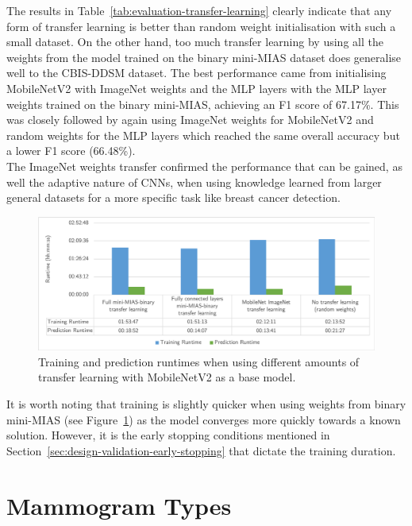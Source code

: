 

The results in Table~\ref{tab:evaluation-transfer-learning} clearly indicate that any form of transfer learning is better than random weight initialisation with such a small dataset. On the other hand, too much transfer learning by using all the weights from the model trained on the binary mini-MIAS dataset does generalise well to the CBIS-DDSM dataset. The best performance came from initialising MobileNetV2 with ImageNet weights and the MLP layers with the MLP layer weights trained on the binary mini-MIAS, achieving an F1 score of 67.17\%. This was closely followed by again using ImageNet weights for MobileNetV2 and random weights for the MLP layers which reached the same overall accuracy but a lower F1 score (66.48\%).\\

The ImageNet weights transfer confirmed the performance that can be gained, as well the adaptive nature of CNNs, when using knowledge learned from larger general datasets for a more specific task like breast cancer detection.

\begin{figure}[h]
\centerline{\includegraphics[width=\textwidth]{figures/evaluation/transfer_learning_experiment/runtimes.png}}
\caption{\label{fig:evaluation-transfer_learning_experiment-runtimes}Training and prediction runtimes when using different amounts of transfer learning with MobileNetV2 as a base model.}
\end{figure}

It is worth noting that training is slightly quicker when using weights from binary mini-MIAS (see Figure~\ref{fig:evaluation-transfer_learning_experiment-runtimes}) as the model converges more quickly towards a known solution. However, it is the early stopping conditions mentioned in Section~\ref{sec:design-validation-early-stopping} that dictate the training duration.

\section{Mammogram Types}

